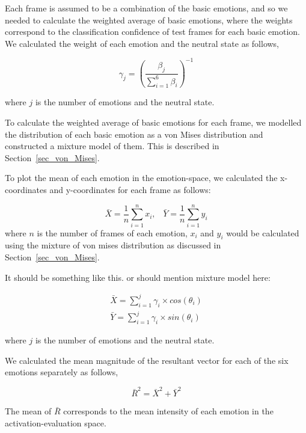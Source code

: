 \documentclass[10pt,journal,cspaper,compsoc]{IEEEtran}
\begin{document}
Each frame is assumed to be a combination of the basic emotions, and so we needed to calculate the weighted average of basic emotions, where the weights correspond to the classification confidence of test frames for each basic emotion. We calculated the weight of each emotion and the neutral state as follows,

\begin{equation}
\gamma_{j}=\left(\frac{\beta_{j}}{\sum \limits_{i=1}^6 \beta_{i}} \right) ^{-1}
\label{eq_weights}
\end{equation}

where $j$ is the number of emotions and the neutral state.

To calculate the weighted average of basic emotions for each frame, we modelled the distribution of each basic emotion as a von Mises distribution and constructed a mixture model of them. This is described in Section~\ref{sec_von_Mises}.

To plot the mean of each emotion in the emotion-space, we calculated the x-coordinates and y-coordinates for each frame as follows:

\begin{equation}
\bar{X}=\frac{1}{n}\sum \limits_{i=1}^n x_{i}, \; \; \; \bar{Y}=\frac{1}{n}\sum \limits_{i=1}^n y_{i}
\end{equation}
where $n$ is the number of frames of each emotion, $x_{i}$ and $y_{i}$ would be calculated using the mixture of von mises distribution as discussed in Section~\ref{sec_von_Mises}.

It should be something like this. or should mention mixture model here:

\begin{equation}
\begin{array}{ll} 
\bar{X}=\sum \limits_{i=1}^j \gamma_{i} \times cos(\theta_{i}) \\
\bar{Y}=\sum \limits_{i=1}^j \gamma_{i} \times sin(\theta_{i})
\end{array}
\end{equation}

where $j$ is the number of emotions and the neutral state.

We calculated the mean magnitude of the resultant vector for each of the six emotions separately as follows,

\begin{equation}
\label{eq:meanint}
\bar{R}^{2}=\bar{X}^{2} + \bar{Y}^{2}
\end{equation}

The mean of $\bar{R}$ corresponds to the mean intensity of each emotion in the activation-evaluation space.
\end{document}
